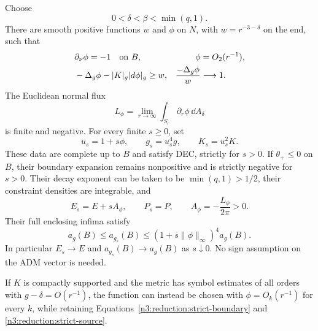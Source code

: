 \begin{lemma}
\label{n3:reduction:strict-direction}
Choose
\[
 0<\delta<\beta<\min(q,1).
\]
There are smooth positive functions $w$ and $\phi$ on $N$, with
$w=r^{-3-\delta}$ on the end, such that
\begin{align}
 &\partial_\nu\phi=-1\quad\hbox{on }B,
       &\phi&=O_2(r^{-1}),\label{n3:reduction:strict-boundary}\\
 &-\Delta_g\phi-|K|_g|d\phi|_g\ge w,
       &\frac{-\Delta_g\phi}{w}&\longrightarrow1.
       \label{n3:reduction:strict-source}
\end{align}
The Euclidean normal flux
\[
 L_\phi=\lim_{r\to\infty}
          \int_{S_r}\partial_r\phi\,\dd A_\delta
\]
is finite and negative.  For every finite $s\ge0$, set
\begin{equation}
 \label{n3:reduction:linear-family}
 u_s=1+s\phi,\qquad g_s=u_s^4g,\qquad K_s=u_s^2K.
\end{equation}
These data are complete up to $B$ and satisfy DEC, strictly for $s>0$.
If $\theta_+\le0$ on $B$, their boundary expansion remains nonpositive
and is strictly negative for $s>0$.  Their decay exponent can be taken to be
$\min(q,1)>1/2$, their constraint densities are integrable, and
\begin{equation}
 \label{n3:reduction:strict-charges}
 E_s=E+sA_\phi,\qquad P_s=P,
 \qquad A_\phi=-\frac{L_\phi}{2\pi}>0.
\end{equation}
Their full enclosing infima satisfy
\begin{equation}
 \label{n3:reduction:strict-areas}
 a_g(B)\le a_{g_s}(B)
       \le (1+s\|\phi\|_\infty)^4a_g(B).
\end{equation}
In particular $E_s\to E$ and $a_{g_s}(B)\to a_g(B)$ as $s\downarrow0$.
No sign assumption on the ADM vector is needed.

If $K$ is compactly supported and the metric has symbol estimates of all
orders with $g-\delta=O(r^{-1})$, the function can instead be chosen with
$\phi=O_k(r^{-1})$ for every $k$, while retaining
Equations~\eqref{n3:reduction:strict-boundary} and
\eqref{n3:reduction:strict-source}.
\end{lemma}

